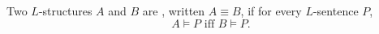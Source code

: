 Two $L$-structures $A$ and $B$ are , written $A \equiv B$, if for every $L$-sentence $P$,
$$A \vDash P \text{ iff } B \vDash P.$$
